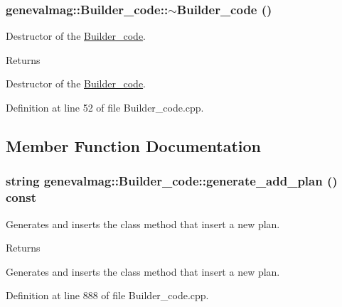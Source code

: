 \hypertarget{classgenevalmag_1_1Builder__code_a9e6e4ec3399e378cc691e69d7ab5c278}{
\subsubsection[{$\sim$Builder\_\-code}]{\setlength{\rightskip}{0pt plus 5cm}genevalmag::Builder\_\-code::$\sim$Builder\_\-code ()}}
\label{classgenevalmag_1_1Builder__code_a9e6e4ec3399e378cc691e69d7ab5c278}
Destructor of the \hyperlink{classgenevalmag_1_1Builder__code}{Builder\_\-code}. \begin{DoxyReturn}{Returns}

\end{DoxyReturn}
Destructor of the \hyperlink{classgenevalmag_1_1Builder__code}{Builder\_\-code}. 

Definition at line 52 of file Builder\_\-code.cpp.



\subsection{Member Function Documentation}
\hypertarget{classgenevalmag_1_1Builder__code_af62cdc4b1ad2302cd368e1b3c4fb99d9}{
\subsubsection[{generate\_\-add\_\-plan}]{\setlength{\rightskip}{0pt plus 5cm}string genevalmag::Builder\_\-code::generate\_\-add\_\-plan () const}}
\label{classgenevalmag_1_1Builder__code_af62cdc4b1ad2302cd368e1b3c4fb99d9}
Generates and inserts the class method that insert a new plan. \begin{DoxyReturn}{Returns}

\end{DoxyReturn}
Generates and inserts the class method that insert a new plan. 

Definition at line 888 of file Builder\_\-code.cpp.



